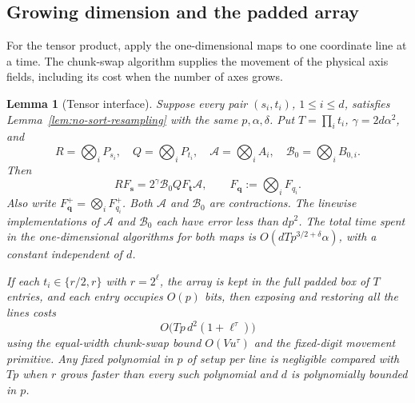 \documentclass[11pt]{article}
\newtheorem{lemma}[theorem]{Lemma}
\theoremstyle{definition}
\begin{document}
\subsection{Growing dimension and the padded array}

For the tensor product, apply the one-dimensional maps to one coordinate
line at a time. The chunk-swap algorithm supplies the movement of the
physical axis fields, including its cost when the number of axes grows.

\begin{lemma}[Tensor interface]
\label{lem:tensor-resampling}
Suppose every pair $(s_i,t_i)$, $1\leq i\leq d$, satisfies
Lemma~\ref{lem:no-sort-resampling} with the same $p,\alpha,\delta$.
Put $T=\prod_i t_i$, $\gamma=2d\alpha^2$, and
\[
 R=\bigotimes_iP_{s_i},\quad Q=\bigotimes_iP_{t_i},\quad
 \mathcal A=\bigotimes_i A_i,\quad
 \mathcal B_0=\bigotimes_i B_{0,i}.
\]
Then
\begin{equation}
 RF_{\boldsymbol s}
   =2^\gamma\mathcal B_0QF_{\boldsymbol t}\mathcal A,
 \qquad F_{\boldsymbol q}:=\bigotimes_iF_{q_i}.
 \label{eq:no-sort-tensor}
\end{equation}
Also write $F_{\boldsymbol q}^+=\bigotimes_iF_{q_i}^+$.
Both $\mathcal A$ and $\mathcal B_0$ are contractions. The linewise
implementations of $\mathcal A$ and $\mathcal B_0$ each have error
less than $dp^2$. The total time spent in the
one-dimensional algorithms for both maps is
$O(dTp^{3/2+\delta}\alpha)$, with a constant independent of $d$.

If each $t_i\in\{r/2,r\}$ with $r=2^\ell$, the array is kept in the
full padded box of $T$ entries, and each entry occupies $O(p)$ bits,
then exposing and restoring all the lines costs
\[
 O\bigl(Tp\,d^2(1+\ell^\tau)\bigr)
\]
using the equal-width chunk-swap bound $O(Vu^\tau)$ and the fixed-digit
movement primitive. Any fixed polynomial in $p$ of setup per line is
negligible compared with $Tp$ when $r$ grows faster than every such
polynomial and $d$ is polynomially bounded in $p$.
\end{lemma}
\end{document}
